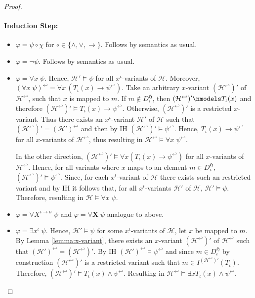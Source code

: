 \documentclass[11pt,a4paper]{article}
\newcommand{\tofo}{\hookleftarrow}
\newcommand{\of}{\iota }
\newcommand{\os}{\iota \to o}
\begin{document}
\begin{proof}
\paragraph*{Induction Step:}
\begin{itemize}
\item $\varphi= \psi \circ \chi$ for $\circ \in \{ \land ,\lor, \to\}$. Follows by semantics as usual.
\item $\varphi= \neg  \psi $.  Follows by semantics as usual.
\item $\varphi = \forall x \; \psi$. Hence, $\mathcal{H}' \models \psi$ for all $x^{\of}$-variants of $\mathcal{H}$. Moreover, $(\forall x \; \psi)^{\tofo}=\forall x \, (T_{\of}(x) \to \psi^{\tofo})$. Take an arbitrary $x$-variant $(\mathcal{H}^{\tofo})'$ of $\mathcal{H}^{\tofo}$, such that $x$ is mapped to $m$. If $m \notin D_{\of}^{\mathfrak{H}}$, then $(\mathcal{H}^{\tofo})' \nmodels T_{\of}(x)$ and therefore $(\mathcal{H}^{\tofo})' \models T_{\of}(x) \to \psi^{\tofo}$. Otherwise, $(\mathcal{H}^{\tofo})'$ is a restricted $x$-variant. Thus there exists an $x^{\of}$-variant $\mathcal{H'}$ of $\mathcal{H}$ such that $(\mathcal{H}^{\tofo})'=(\mathcal{H}')^{\tofo}$ and then by IH $(\mathcal{H}^{\tofo})' \models \psi^{\tofo}$. Hence,  $T_{\of}(x) \to \psi^{\tofo}$ for all $x$-variants of $\mathcal{H}^{\tofo}$, thus resulting in  $\mathcal{H}^{\tofo}\models \forall x\; \psi^{\tofo}$. 

In the other direction, $(\mathcal{H}^{\tofo})' \models \forall x (T_{\of}(x) \to \psi^{\tofo})$ for all $x$-variants of $\mathcal{H}^{\tofo}$. Hence, for all variants where $x$ maps to an element $m \in D_{\of}^{\mathfrak{H}}$,  $(\mathcal{H}^{\tofo})' \models \psi^{\tofo}$. Since, for each $x^{\of}$-variant of $\mathcal{H}$ there exists such an restricted variant and by IH it follows that, for all $x^{\of}$-variants $\mathcal{H}'$ of $\mathcal{H}$, $\mathcal{H}' \models \psi$. Therefore, resulting in $\mathcal{H} \models \forall x \; \psi$.

\item  $\varphi = \forall X^{\os} \; \psi$ and $\varphi = \forall \mathbf{X} \; \psi$ analogue to above.

\item $\varphi = \exists x^{\of} \; \psi$. Hence, $\mathcal{H}' \models \psi$ for some $x^{\of}$-variants of $\mathcal{H}$, let $x$ be mapped to $m$. By Lemma \ref{lemma:x-variant}, there exists an $x$-variant $(\mathcal{H}^{\tofo})'$ of $\mathcal{H}^{\tofo}$ such that $(\mathcal{H}')^{\tofo} =(\mathcal{H}^{\tofo})'$.  By IH $(\mathcal{H}')^{\tofo} \models \psi^{\tofo}$ and since $m \in D_{\of}^{\mathfrak{H}}$ by construction $(\mathcal{H}^{\tofo})'$ is a restricted variant such that $m\in I^{(\mathcal{H}^{\tofo})'}(T_{\of})$. Therefore, $(\mathcal{H}^{\tofo})' \models T_{\of}(x)\land \psi^{\tofo}$. Resulting in $\mathcal{H}^{\tofo} \models \exists x T_{\of}(x) \land \psi^{\tofo}$.


\end{itemize}
\end{proof}
\end{document}
